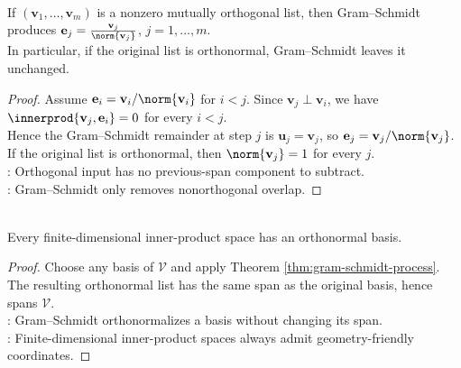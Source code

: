 \begin{lemma} \label{lem:gram-schmidt-preserves-orthogonal-lists} \\
If $(\mathbf{v}_1,\ldots,\mathbf{v}_m)$ is a nonzero mutually orthogonal list, then Gram--Schmidt produces $\mathbf{e}_j=\frac{\mathbf{v}_j}{\norm{\mathbf{v}_j}}$, $j=1,\ldots,m$.\\
In particular, if the original list is orthonormal, Gram--Schmidt leaves it unchanged.
\begin{proof}
Assume $\mathbf{e}_i=\mathbf{v}_i/\norm{\mathbf{v}_i}$ for $i<j$. Since $\mathbf{v}_j\perp\mathbf{v}_i$, we have $\innerprod{\mathbf{v}_j,\mathbf{e}_i}=0$ for every $i<j$.\\
Hence the Gram--Schmidt remainder at step $j$ is $\mathbf{u}_j=\mathbf{v}_j$, so $\mathbf{e}_j=\mathbf{v}_j/\norm{\mathbf{v}_j}$.\\
If the original list is orthonormal, then $\norm{\mathbf{v}_j}=1$ for every $j$.\\
: Orthogonal input has no previous-span component to subtract.\\
: Gram--Schmidt only removes nonorthogonal overlap.
\end{proof}
\end{lemma}

\begin{corollary} \label{cor:finite-dimensional-inner-product-space-has-orthonormal-basis} \\
Every finite-dimensional inner-product space has an orthonormal basis.
\begin{proof}
Choose any basis of $\mathcal{V}$ and apply Theorem \ref{thm:gram-schmidt-process}.\\
The resulting orthonormal list has the same span as the original basis, hence spans $\mathcal{V}$.\\
: Gram--Schmidt orthonormalizes a basis without changing its span.\\
: Finite-dimensional inner-product spaces always admit geometry-friendly coordinates.
\end{proof}
\end{corollary}

